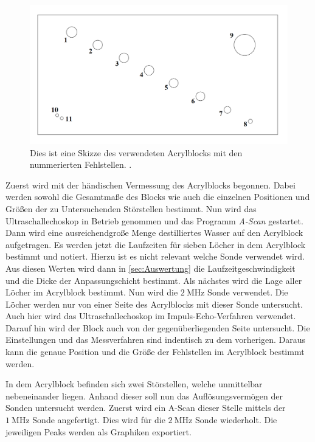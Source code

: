 \begin{figure}
    \centering
	\includegraphics[width=\textwidth]{content/Acrylblock.png}
    \caption{Dies ist eine Skizze des verwendeten Acrylblocks mit den nummerierten Fehlstellen. \cite{vUS2}.}
    \label{fig:acrylskizze}
\end{figure}

Zuerst wird mit der händischen Vermessung des Acrylblocks begonnen. Dabei werden sowohl die Gesamtmaße des Blocks wie auch die einzelnen Positionen und Größen der zu 
Untersuchenden Störstellen bestimmt. Nun wird das Ultraschallechoskop in Betrieb genommen und das Programm \textit{A-Scan} gestartet. Dann wird eine ausreichendgroße Menge destilliertes
Wasser auf den Acrylblock aufgetragen. Es werden jetzt die Laufzeiten für sieben Löcher in dem Acrylblock bestimmt und notiert. Hierzu ist es nicht relevant welche Sonde verwendet wird.
Aus diesen Werten wird dann in \autoref{sec:Auswertung} die Laufzeitgeschwindigkeit und die Dicke der Anpassungschicht bestimmt. Als nächstes wird die Lage aller Löcher im Acrylblock
bestimmt. Nun wird die $\qty{2}{\mega\hertz}$ Sonde verwendet. Die Löcher werden nur von einer Seite des Acrylblocks mit dieser Sonde untersucht. Auch hier wird das Ultraschallechoskop 
im Impuls-Echo-Verfahren verwendet. 
Darauf hin wird der Block auch von der gegenüberliegenden Seite untersucht. Die Einstellungen und das Messverfahren sind indentisch zu dem vorherigen. Daraus kann die genaue
Position und die Größe der Fehlstellen im Acrylblock bestimmt werden.

In dem Acrylblock befinden sich zwei Störstellen, welche unmittelbar nebeneinander liegen. Anhand dieser soll nun das Auflösungsvermögen der Sonden untersucht werden. Zuerst wird 
ein A-Scan dieser Stelle mittels der $\qty{1}{\mega\hertz}$ Sonde angefertigt. Dies wird für die $\qty{2}{\mega\hertz}$ Sonde wiederholt. Die jeweiligen Peaks werden als Graphiken
exportiert.

